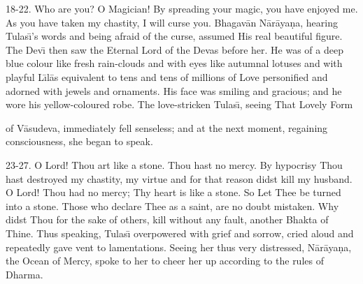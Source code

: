 18-22. Who are you? O Magician! By spreading your magic, you have enjoyed me. As you have taken my chastity, I will curse you. Bhagav\=an N\=ar\=aya\d{n}a, hearing Tulas\={\i}'s words and being afraid of the curse, assumed His real beautiful figure. The Dev\={\i} then saw the Eternal Lord of the Devas before her. He was of a deep blue colour like fresh rain-clouds and with eyes like autumnal lotuses and with playful L\={\i}l\=as equivalent to tens and tens of millions of Love personified and adorned with jewels and ornaments. His face was smiling and gracious; and he wore his yellow-coloured robe. The love-stricken Tulas\={\i}, seeing That Lovely Form

of V\=asudeva, immediately fell senseless; and at the next moment, regaining consciousness, she began to speak.

23-27. O Lord! Thou art like a stone. Thou hast no mercy. By hypocrisy Thou hast destroyed my chastity, my virtue and for that reason didst kill my husband. O Lord! Thou had no mercy; Thy heart is like a stone. So Let Thee be turned into a stone. Those who declare Thee as a saint, are no doubt mistaken. Why didst Thou for the sake of others, kill without any fault, another Bhakta of Thine. Thus speaking, Tulas\={\i} overpowered with grief and sorrow, cried aloud and repeatedly gave vent to lamentations. Seeing her thus very distressed, N\=ar\=aya\d{n}a, the Ocean of Mercy, spoke to her to cheer her up according to the rules of Dharma.

